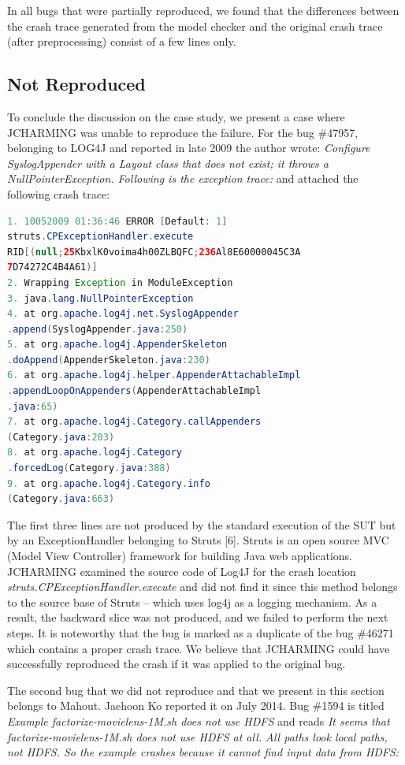 \documentclass[12pt]{report}
\begin{document}
In all bugs that were partially reproduced, we found that the
differences between the crash trace generated from the model checker and
the original crash trace (after preprocessing) consist of a few lines
only.

\subsection{Not Reproduced}\label{not-reproduced}

To conclude the discussion on the case study, we present a case where
JCHARMING was unable to reproduce the failure. For the bug \#47957,
belonging to LOG4J and reported in late 2009 the author wrote:
\emph{Configure SyslogAppender with a Layout class that does not exist;
it throws a NullPointerException. Following is the exception trace:} and
attached the following crash trace:

\begin{lstlisting}[language=Java]
1. 10052009 01:36:46 ERROR [Default: 1]
struts.CPExceptionHandler.execute
RID[(null;25KbxlK0voima4h00ZLBQFC;236Al8E60000045C3A
7D74272C4B4A61)] 
2. Wrapping Exception in ModuleException
3. java.lang.NullPointerException
4. at org.apache.log4j.net.SyslogAppender
.append(SyslogAppender.java:250)
5. at org.apache.log4j.AppenderSkeleton
.doAppend(AppenderSkeleton.java:230)
6. at org.apache.log4j.helper.AppenderAttachableImpl
.appendLoopOnAppenders(AppenderAttachableImpl
.java:65)
7. at org.apache.log4j.Category.callAppenders
(Category.java:203)
8. at org.apache.log4j.Category
.forcedLog(Category.java:388)
9. at org.apache.log4j.Category.info
(Category.java:663)
\end{lstlisting}

The first three lines are not produced by the standard execution of the
SUT but by an ExceptionHandler belonging to Struts {[}6{]}. Struts is an
open source MVC (Model View Controller) framework for building Java web
applications. JCHARMING examined the source code of Log4J for the crash
location \emph{struts.CPExceptionHandler.execute} and did not find it
since this method belongs to the source base of Struts -- which uses
log4j as a logging mechanism. As a result, the backward slice was not
produced, and we failed to perform the next steps. It is noteworthy that
the bug is marked as a duplicate of the bug \#46271 which contains a
proper crash trace. We believe that JCHARMING could have successfully
reproduced the crash if it was applied to the original bug.

The second bug that we did not reproduce and that we present in this
section belongs to Mahout. Jaehoon Ko reported it on July 2014. Bug
\#1594 is titled \emph{Example factorize-movielens-1M.sh does not use
HDFS} and reads \emph{It seems that factorize-movielens-1M.sh does not
use HDFS at all. All paths look local paths, not HDFS. So the example
crashes because it cannot find input data from HDFS:}
\end{document}
